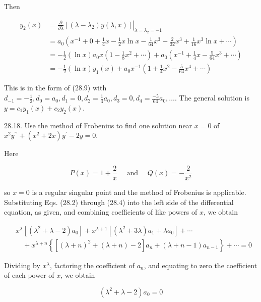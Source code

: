 \documentclass[10pt]{article}
\begin{document}
Then


\begin{align*}
y_{2}(x) & =\left.\frac{\partial}{\partial \lambda}\left[\left(\lambda-\lambda_{2}\right) y(\lambda, x)\right]\right|_{\lambda=\lambda_{2}=-1} \\
& =a_{0}\left(x^{-1}+0+\frac{1}{4} x-\frac{1}{2} x \ln x-\frac{1}{64} x^{3}-\frac{2}{32} x^{3}+\frac{1}{16} x^{3} \ln x+\cdots\right) \\
& =-\frac{1}{2}(\ln x) a_{0} x\left(1-\frac{1}{8} x^{2}+\cdots\right)+a_{0}\left(x^{-1}+\frac{1}{4} x-\frac{5}{64} x^{3}+\cdots\right) \\
& =-\frac{1}{2}(\ln x) y_{1}(x)+a_{0} x^{-1}\left(1+\frac{1}{4} x^{2}-\frac{5}{64} x^{4}+\cdots\right) \tag{1}
\end{align*}


This is in the form of (28.9) with $d_{-1}=-\frac{1}{2}, d_{0}=a_{0}, d_{1}=0, d_{2}=\frac{1}{4} a_{0}, d_{3}=0, d_{4}=\frac{-5}{64} a_{0}, \ldots$. The general solution is\\
$y=c_{1} y_{1}(x)+c_{2} y_{2}(x)$.

28.18. Use the method of Frobenius to find one solution near $x=0$ of $x^{2} y^{\prime \prime}+\left(x^{2}+2 x\right) y^{\prime}-2 y=0$.

Here

$$
P(x)=1+\frac{2}{x} \quad \text { and } \quad Q(x)=-\frac{2}{x^{2}}
$$

so $x=0$ is a regular singular point and the method of Frobenius is applicable. Substituting Eqs. (28.2) through (28.4) into the left side of the differential equation, as given, and combining coefficients of like powers of $x$, we obtain

$$
\begin{aligned}
& x^{\lambda}\left[\left(\lambda^{2}+\lambda-2\right) a_{0}\right]+x^{\lambda+1}\left[\left(\lambda^{2}+3 \lambda\right) a_{1}+\lambda a_{0}\right]+\cdots \\
& \quad+x^{\lambda+n}\left\{\left[(\lambda+n)^{2}+(\lambda+n)-2\right] a_{n}+(\lambda+n-1) a_{n-1}\right\}+\cdots=0
\end{aligned}
$$

Dividing by $x^{\lambda}$, factoring the coefficient of $a_{n}$, and equating to zero the coefficient of each power of $x$, we obtain


\begin{equation*}
\left(\lambda^{2}+\lambda-2\right) a_{0}=0 \tag{1}
\end{equation*}
\end{document}
